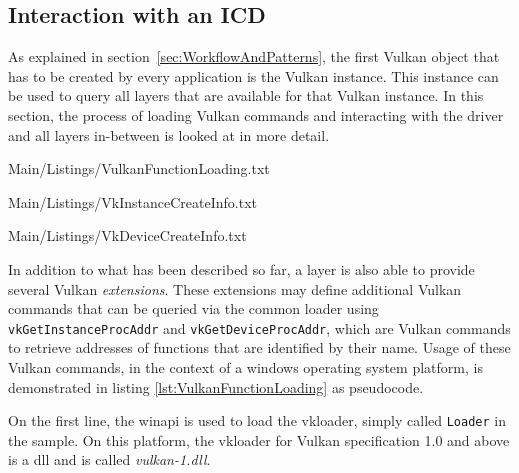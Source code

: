    \subsection{Interaction with an ICD}

    As explained in section~\ref{sec:WorkflowAndPatterns}, the first Vulkan object that has to be created by every application is the Vulkan instance.
    This instance can be used to query all layers that are available for that Vulkan instance.
    In this section, the process of loading Vulkan commands and interacting with the \gls{driver} and all layers in-between is looked at in more detail.

    
    {Main/Listings/VulkanFunctionLoading.txt}

    
    {Main/Listings/VkInstanceCreateInfo.txt}

    
    {Main/Listings/VkDeviceCreateInfo.txt}

    In addition to what has been described so far, a layer is also able to provide several Vulkan \textit{extensions}.
    These extensions may define additional Vulkan commands that can be queried via the common loader using \lstinline{vkGetInstanceProcAddr} and \lstinline{vkGetDeviceProcAddr}, which are Vulkan commands to retrieve addresses of functions that are identified by their name.
    Usage of these Vulkan commands, in the context of a \gls{windows} operating system platform, is demonstrated in listing \ref{lst:VulkanFunctionLoading} as pseudocode.

    On the first line, the \gls{winapi} is used to load the \gls{vkloader}, simply called \lstinline{Loader} in the sample.
    On this platform, the \gls{vkloader} for Vulkan specification 1.0 and above is a \gls{dll} and is called \textit{vulkan-1.dll}.

